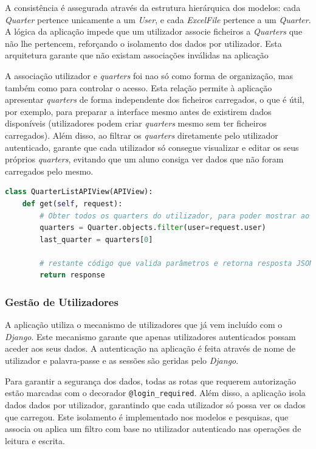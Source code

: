 A consistência é assegurada através da estrutura hierárquica dos modelos: cada \textit{Quarter} pertence unicamente a um \textit{User}, e cada \textit{ExcelFile} pertence a um \textit{Quarter}. A lógica da aplicação impede que um utilizador associe ficheiros a \textit{Quarters} que não lhe pertencem, reforçando o isolamento dos dados por utilizador. Esta arquitetura garante que não existam associações inválidas na aplicação 

A associação utilizador e \textit{quarters} foi nao só como forma de organização, mas também como para controlar o acesso. Esta relação permite à aplicação apresentar \textit{quarters} de forma independente dos ficheiros carregados, o que é útil, por exemplo, para preparar a interface mesmo antes de existirem dados disponíveis (utilizadores podem criar \textit{quarters} mesmo sem ter ficheiros carregados). Além disso, ao filtrar os \textit{quarters} diretamente pelo utilizador autenticado, garante que cada utilizador só consegue visualizar e editar os seus próprios \textit{quarters}, evitando que um aluno consiga ver dados que não foram carregados pelo mesmo.

\begin{lstlisting}[language=Python, caption={Excerto do código \textit{Python} do \textit{endpoint} para listagem de \textit{quarters} }]
class QuarterListAPIView(APIView):
    def get(self, request):
        # Obter todos os quarters do utilizador, para poder mostrar ao utilizador onde pode carregar ficheiros
        quarters = Quarter.objects.filter(user=request.user)
        last_quarter = quarters[0]
       
        # restante código que valida parâmetros e retorna resposta JSON com os dados do quarter
        return response
\end{lstlisting}


\subsubsection{Gestão de Utilizadores}

A aplicação utiliza o mecanismo de utilizadores que já vem incluído com o \textit{Django}. Este mecanismo garante que apenas utilizadores autenticados possam aceder aos seus dados. A autenticação na aplicação é feita através de nome de utilizador e palavra-passe e as sessões são geridas pelo \textit{Django}.

Para garantir a segurança dos dados, todas as rotas que requerem autorização estão marcadas com o decorador \texttt{@login\_required}. Além disso, a aplicação isola dados dados por utilizador, garantindo que cada utilizador só possa ver os dados que carregou. Este isolamento é implementado nos modelos e pesquisas, que associa ou aplica um filtro com base no utilizador autenticado nas operações de leitura e escrita.

